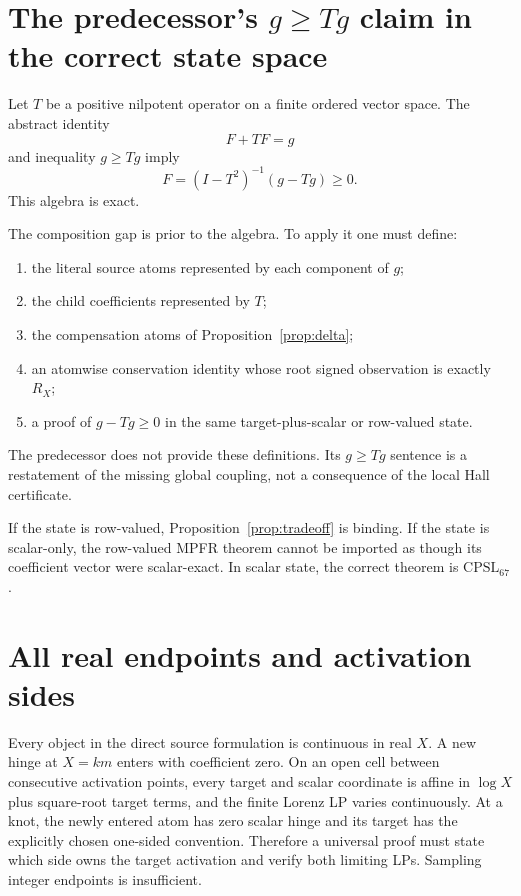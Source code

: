 \documentclass[11pt]{article}
\newcommand{\CPSL}{\mathrm{CPSL}_{67}}
\newcommand{\1}{\mathbf 1}
\begin{document}
\section{The predecessor's $g\ge Tg$ claim in the correct state space}

Let $T$ be a positive nilpotent operator on a finite ordered vector space.  The abstract identity
\[
F+TF=g
\]
and inequality $g\ge Tg$ imply
\[
F=(I-T^2)^{-1}(g-Tg)\ge0.
\]
This algebra is exact.

The composition gap is prior to the algebra.  To apply it one must define:
\begin{enumerate}[label=(\roman*)]
\item the literal source atoms represented by each component of $g$;
\item the child coefficients represented by $T$;
\item the compensation atoms of Proposition~\ref{prop:delta};
\item an atomwise conservation identity whose root signed observation is exactly $R_X$;
\item a proof of $g-Tg\ge0$ in the same target-plus-scalar or row-valued state.
\end{enumerate}
The predecessor does not provide these definitions.  Its $g\ge Tg$ sentence is a restatement of the missing global coupling, not a consequence of the local Hall certificate.

If the state is row-valued, Proposition~\ref{prop:tradeoff} is binding.  If the state is scalar-only, the row-valued MPFR theorem cannot be imported as though its coefficient vector were scalar-exact.  In scalar state, the correct theorem is $\CPSL$.

\section{All real endpoints and activation sides}

Every object in the direct source formulation is continuous in real $X$.  A new hinge at $X=km$ enters with coefficient zero.  On an open cell between consecutive activation points, every target and scalar coordinate is affine in $\log X$ plus square-root target terms, and the finite Lorenz LP varies continuously.  At a knot, the newly entered atom has zero scalar hinge and its target has the explicitly chosen one-sided convention.  Therefore a universal proof must state which side owns the target activation and verify both limiting LPs.  Sampling integer endpoints is insufficient.
\end{document}

